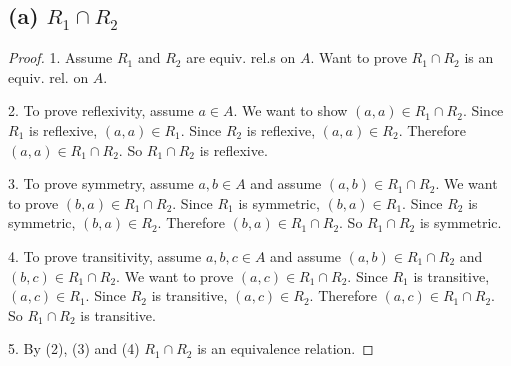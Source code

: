 \documentclass[14pt]{extarticle}
\begin{document}
\subsection{(a) $R_1 \cap R_2$}
\begin{proof}
1. Assume $R_1$ and $R_2$ are equiv. rel.s on $A$. Want to prove $R_1 \cap R_2$ is an equiv. rel. on $A$.

2. To prove reflexivity, assume $a \in A$. We want to show $(a,a) \in R_1 \cap R_2$. Since $R_1$ is reflexive, $(a,a) \in R_1$. Since $R_2$ is reflexive, $(a,a) \in R_2$. Therefore $(a,a) \in R_1 \cap R_2$. So $R_1 \cap R_2$ is reflexive.

3. To prove symmetry, assume $a,b \in A$ and assume $(a,b) \in R_1 \cap R_2$. We want to prove $(b,a) \in R_1 \cap R_2$. Since $R_1$ is symmetric, $(b,a) \in R_1$. Since $R_2$ is symmetric, $(b,a) \in R_2$. Therefore $(b,a) \in R_1 \cap R_2$. So $R_1 \cap R_2$ is symmetric.

4. To prove transitivity, assume $a,b,c \in A$ and assume $(a,b) \in R_1 \cap R_2$ and $(b,c) \in R_1 \cap R_2$. We want to prove $(a,c) \in R_1 \cap R_2$. Since $R_1$ is transitive, $(a,c) \in R_1$. Since $R_2$ is transitive, $(a,c) \in R_2$. Therefore $(a,c) \in R_1 \cap R_2$. So $R_1 \cap R_2$ is transitive.

5. By (2), (3) and (4) $R_1 \cap R_2$ is an equivalence relation.
\end{proof}
\end{document}
